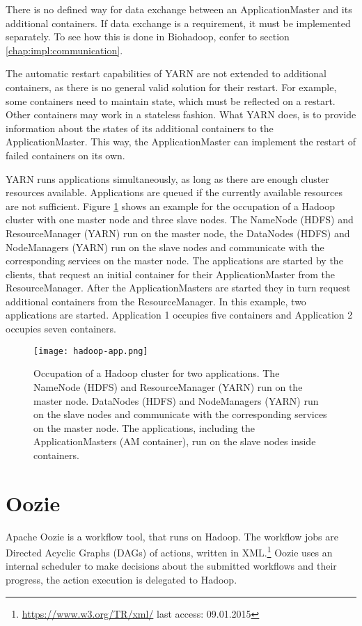 There is no defined way for data exchange between an ApplicationMaster and its additional containers. If data exchange is a requirement, it must be implemented separately. To see how this is done in Biohadoop, confer to section \ref{chap:impl:communication}.

The automatic restart capabilities of YARN are not extended to additional containers, as there is no general valid solution for their restart. For example, some containers need to maintain state, which must be reflected on a restart. Other containers may work in a stateless fashion. What YARN does, is to provide information about the states of its additional containers to the ApplicationMaster. This way, the ApplicationMaster can implement the restart of failed containers on its own.

YARN runs applications simultaneously, as long as there are enough cluster resources available. Applications are queued if the currently available resources are not sufficient. Figure \ref{fig:hadoop-app} shows an example for the occupation of a Hadoop cluster with one master node and three slave nodes. The NameNode (HDFS) and ResourceManager (YARN) run on the master node, the DataNodes (HDFS) and NodeManagers (YARN) run on the slave nodes and communicate with the corresponding services on the master node. The applications are started by the clients, that request an initial container for their ApplicationMaster from the ResourceManager. After the ApplicationMasters are started they in turn request additional containers from the ResourceManager. In this example, two applications are started. Application 1 occupies five containers and Application 2 occupies seven containers.

\begin{figure}
  \centering
  \texttt{[image: hadoop-app.png]}
  \caption[Occupation of a Hadoop cluster for two applications]{Occupation of a Hadoop cluster for two applications. The NameNode (HDFS) and ResourceManager (YARN) run on the master node. DataNodes (HDFS) and NodeManagers (YARN) run on the slave nodes and communicate with the corresponding services on the master node. The applications, including the ApplicationMasters (AM container), run on the slave nodes inside containers.}
  \label{fig:hadoop-app}
\end{figure}

\section{Oozie}
\label{chap:hadoop:oozie}
Apache Oozie is a workflow tool, that runs on Hadoop. The workflow jobs are Directed Acyclic Graphs (DAGs) of actions, written in XML.\footnote{\url{https://www.w3.org/TR/xml/} last access: 09.01.2015} Oozie uses an internal scheduler to make decisions about the submitted workflows and their progress, the action execution is delegated to Hadoop.

